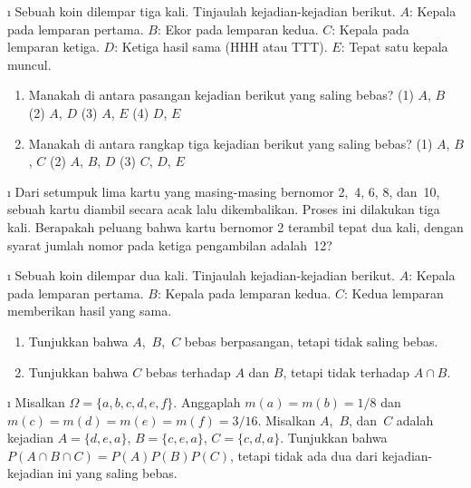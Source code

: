 \begin{LJSItem}
\i\label{exer 4.1.5} Sebuah koin dilempar tiga kali.  Tinjaulah kejadian-kejadian berikut.\newline
$A$: Kepala pada lemparan pertama.\newline
$B$: Ekor pada lemparan kedua.\newline
$C$: Kepala pada lemparan ketiga.\newline
$D$: Ketiga hasil sama (HHH atau TTT).\newline
$E$: Tepat satu kepala muncul.
\begin{enumerate}
\item Manakah di antara pasangan kejadian berikut yang saling bebas?\newline
(1) $A$, $B$\newline
(2) $A$, $D$\newline
(3) $A$, $E$\newline
(4) $D$, $E$

\item Manakah di antara rangkap tiga kejadian berikut yang saling
bebas?\newline
(1) $A$, $B$, $C$\newline
(2) $A$, $B$, $D$\newline
(3) $C$, $D$, $E$
\end{enumerate}

\i\label{exer 4.1.6} Dari setumpuk lima kartu yang masing-masing bernomor 2,~4, 6, 8, dan~10,
sebuah kartu diambil secara acak lalu dikembalikan.  Proses ini dilakukan tiga kali.  Berapakah
peluang bahwa kartu bernomor 2 terambil tepat dua kali, dengan syarat
jumlah nomor pada ketiga pengambilan adalah~12?

\i\label{exer 4.1.7} Sebuah koin dilempar dua kali.  Tinjaulah
kejadian-kejadian berikut.\newline
$A$: Kepala pada lemparan pertama.\newline
$B$: Kepala pada lemparan kedua.\newline
$C$: Kedua lemparan memberikan hasil yang sama.
\begin{enumerate}
\item Tunjukkan bahwa $A$,~$B$,~$C$ bebas berpasangan, tetapi tidak
saling bebas.

\item Tunjukkan bahwa $C$ bebas terhadap $A$ dan $B$, tetapi tidak terhadap $A \cap B$.
\end{enumerate}

\i\label{exer 4.1.8} Misalkan $\Omega = \{a,b,c,d,e,f\}$.  Anggaplah $m(a) = m(b) = 1/8$ dan
$m(c) = m(d) = m(e) = m(f) = 3/16$.  Misalkan $A$,~$B$, dan~$C$ adalah kejadian $A = \{d,e,a\}$, 
$B = \{c,e,a\}$, $C = \{c,d,a\}$.  Tunjukkan bahwa $P(A \cap B \cap C) = P(A)P(B)P(C)$, tetapi tidak ada dua dari
kejadian-kejadian ini yang saling bebas.
 

\end{LJSItem}
